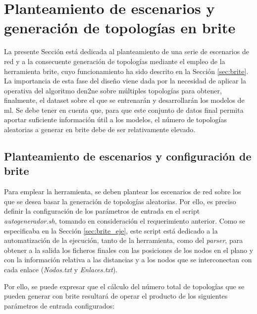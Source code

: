 \section{Planteamiento de escenarios y generación de topologías en \acrshort{brite}}
\label{sec:ejebrite}

La presente Sección está dedicada al planteamiento de una serie de escenarios de red y a la consecuente generación de topologías mediante el empleo de la herramienta \gls{brite}, cuyo funcionamiento ha sido descrito en la Sección \ref{sec:brite}. La importancia de esta fase del diseño viene dada por la necesidad de aplicar la operativa del algoritmo \gls{den2ne} sobre múltiples topologías para obtener, finalmente, el dataset sobre el que se entrenarán y desarrollarán los modelos de \gls{ml}. Se debe tener en cuenta que, para que este conjunto de datos final permita aportar suficiente información útil a los modelos, el número de topologías aleatorias a generar en \gls{brite} debe de ser relativamente elevado.

\vspace{3mm}

\subsection{Planteamiento de escenarios y configuración de \acrshort{brite}}
\label{sec:conftopo}

Para emplear la herramienta, se deben plantear los escenarios de red sobre los que se desea basar la generación de topologías aleatorias. Por ello, es preciso definir la configuración de los parámetros de entrada en el script \textit{autogenerador.sh}, tomando en consideración el requerimiento anterior. Como se especificaba en la Sección \ref{sec:brite_eje}, este script está dedicado a la automatización de la ejecución, tanto de la herramienta, como del \textit{parser}, para obtener a la salida los ficheros finales con las posiciones de los nodos en el plano y con la información relativa a las distancias y a los nodos que se interconectan con cada enlace (\textit{Nodos.txt} y \textit{Enlaces.txt}). 

\vspace{3mm}

Por ello, se puede expresar que el cálculo del número total de topologías que se pueden generar con \gls{brite} resultará de operar el producto de los siguientes parámetros de entrada configurados:

